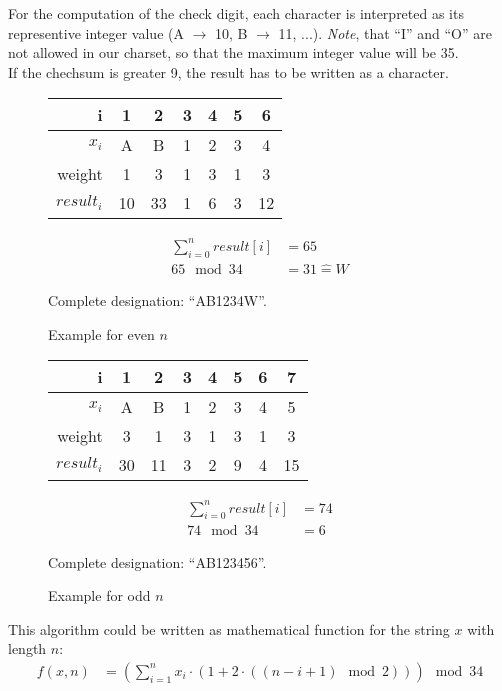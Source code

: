 For the computation of the check digit, each character is interpreted as its
representive integer value (A $\rightarrow$ 10, B $\rightarrow$ 11, ...).
\textit{Note}, that ``I'' and ``O'' are not allowed in our charset, so that the
maximum integer value will be 35. \\

If the chechsum is greater 9, the result has to be written as a character.


\begin{multicols}{2}
	\begin{figure}[H]
		\centering

		\begin{tabular}{r|c|c|c|c|c|c}
			i          & 1  & 2  & 3 & 4 & 5 & 6 \\
			\hline
			$x_i$      & A  & B  & 1 & 2 & 3 & 4 \\
			weight     & 1  & 3  & 1 & 3 & 1 & 3 \\
			\hline
			$result_i$ & 10 & 33 & 1 & 6 & 3 & 12 \\
		\end{tabular}

		\begin{align*}
			\sum_{i=0}^{n} result[i] &= 65 \\
			65 \mod 34 &= 31 \hat{=} W
		\end{align*}

		Complete designation: ``AB1234W''.

		\caption{Example for even $n$}
	\end{figure}

	\begin{figure}[H]
		\centering

		\begin{tabular}{r|c|c|c|c|c|c|c}
			i          & 1  & 2  & 3 & 4 & 5 & 6 & 7 \\
			\hline
			$x_i$      & A  & B  & 1 & 2 & 3 & 4 & 5 \\
			weight     & 3  & 1  & 3 & 1 & 3 & 1 & 3 \\
			\hline
			$result_i$ & 30 & 11 & 3 & 2 & 9 & 4 & 15 \\
		\end{tabular}

		\begin{align*}
			\sum_{i=0}^{n} result[i] &= 74 \\
			74 \mod 34 &= 6
		\end{align*}

		Complete designation: ``AB123456''.

		\caption{Example for odd $n$}
	\end{figure}
\end{multicols}


This algorithm could be written as mathematical function for the string $x$ with
length $n$:
\begin{align*}
	f(x, n) &= \left(\sum_{i=1}^{n} x_i \cdot \left(1 + 2 \cdot \left( \left(
		n - i + 1 \right) \mod 2 \right) \right) \right) \mod 34
\end{align*}
